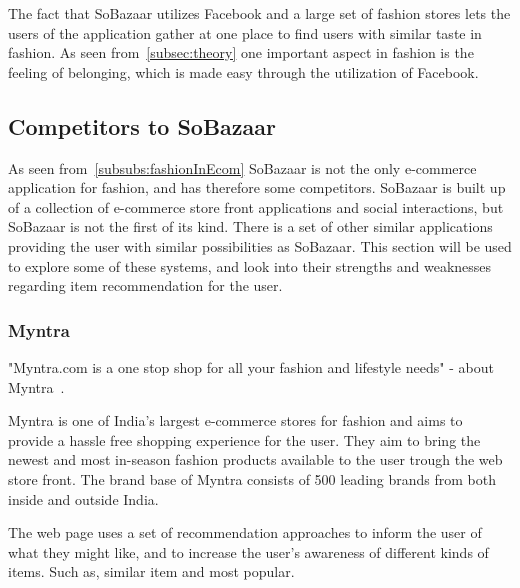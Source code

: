   The fact that SoBazaar utilizes Facebook and a large set of fashion stores lets the users of the application gather at one place to find users with similar taste in fashion.
  As seen from~\ref{subsec:theory} one important aspect in fashion is the feeling of belonging, which is made easy through the utilization of Facebook.

\subsection{Competitors to SoBazaar}


    As seen from~\ref{subsubs:fashionInEcom} SoBazaar is not the only e-commerce application for fashion, and has therefore some competitors.
    SoBazaar is built up of a collection of e-commerce store front applications and social interactions, but SoBazaar is not the first of its kind.
    There is a set of other similar applications providing the user with similar possibilities as SoBazaar.
    This section will be used to explore some of these systems, and look into their strengths and weaknesses regarding item recommendation for the user.

\subsubsection{Myntra} %
\label{par:myntra}
    "Myntra.com is a one stop shop for all your fashion and lifestyle needs" - about Myntra~\cite{myntra}.

    Myntra is one of India's largest e-commerce stores for fashion and aims to  provide a hassle free shopping experience for the user.
    They aim to bring the newest and most in-season fashion products available to the user trough the web store front.
    The brand base of Myntra consists of 500 leading brands from both inside and outside India.

    The web page uses a set of recommendation approaches to inform the user of what they might like, and to increase the user's awareness of different kinds of items. Such as, similar item and most popular.


